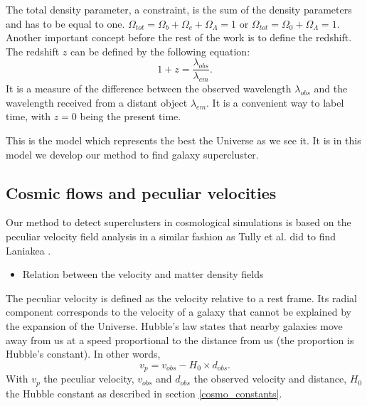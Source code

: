 \documentclass[12pt]{article}
\begin{document}
\begin{par}
\begin{enumerate}
\end{enumerate}
The total density parameter, a constraint, is the sum of
 the density parameters and has to be equal to one. $\Omega_{tot} = \Omega_b + \Omega_c + \Omega_{\Lambda} =1$ or $\Omega_{tot} = \Omega_0 + \Omega_{\Lambda} =1$.\\

Another important concept before the rest of the work is to define the redshift. The redshift $z$ can be defined by the following equation\cite{peebles_cosmological_2003}: 
\[
1 + z = \frac{\lambda_{obs}}{\lambda_{em}}.
\] 
It is a measure of the difference between the observed
 wavelength $\lambda_{obs}$ and the wavelength received
  from a distant object $\lambda_{em}$. It is a convenient
   way to label time, with $z=0$ being the
    present time. \\
\end{par}

\begin{par}
This is the model which represents the best the Universe as we see it. It is in this model we develop our method to find galaxy supercluster.
\end{par}




\subsection{Cosmic flows and peculiar velocities}
\label{sec:peculiar_vel}
Our method to detect superclusters in cosmological
 simulations is based on the peculiar velocity field
  analysis in a similar fashion as Tully et al. did to find Laniakea \cite{tully_laniakea_2014}
    \cite{tempel_cosmology:_2014}.
\begin{itemize}
\item Relation between the velocity and matter density fields
\end{itemize}
\begin{par}
The peculiar velocity is defined as the velocity relative to a rest frame. Its radial component corresponds to the velocity of a galaxy that cannot be explained by the expansion of the Universe. Hubble's law states that nearby galaxies move away from us at a speed proportional to the distance from us (the proportion is Hubble's constant). In other words,
\[ 
v_p = v_{obs} - H_{0} \times d_{obs} .
\]
With $v_p$ the peculiar velocity, $v_{obs}$ and $d_{obs}$ the observed velocity and distance, $H_{0}$ the Hubble constant as described in section \ref{cosmo_constants}.
\end{par}
\end{document}
